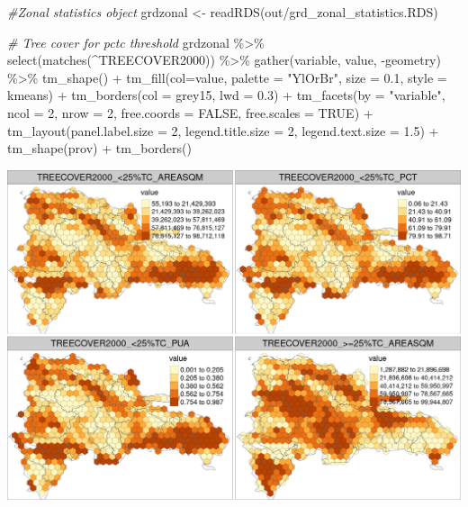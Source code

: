 \documentclass[10pt,landscape,a3paper]{article}
\newenvironment{Shaded}{\begin{snugshade}}{\end{snugshade}}
\newcommand{\AttributeTok}[1]{\textcolor[rgb]{0.77,0.63,0.00}{#1}}
\newcommand{\CommentTok}[1]{\textcolor[rgb]{0.56,0.35,0.01}{\textit{#1}}}
\newcommand{\ConstantTok}[1]{\textcolor[rgb]{0.00,0.00,0.00}{#1}}
\newcommand{\DecValTok}[1]{\textcolor[rgb]{0.00,0.00,0.81}{#1}}
\newcommand{\FloatTok}[1]{\textcolor[rgb]{0.00,0.00,0.81}{#1}}
\newcommand{\FunctionTok}[1]{\textcolor[rgb]{0.00,0.00,0.00}{#1}}
\newcommand{\NormalTok}[1]{#1}
\newcommand{\OtherTok}[1]{\textcolor[rgb]{0.56,0.35,0.01}{#1}}
\newcommand{\SpecialCharTok}[1]{\textcolor[rgb]{0.00,0.00,0.00}{#1}}
\newcommand{\StringTok}[1]{\textcolor[rgb]{0.31,0.60,0.02}{#1}}
\begin{document}
\begin{Shaded}
\begin{Highlighting}[]
\CommentTok{\#Zonal statistics object}
\NormalTok{grdzonal }\OtherTok{\textless{}{-}} \FunctionTok{readRDS}\NormalTok{(}\StringTok{\textquotesingle{}out/grd\_zonal\_statistics.RDS\textquotesingle{}}\NormalTok{)}

\CommentTok{\# Tree cover for pctc threshold}
\NormalTok{grdzonal }\SpecialCharTok{\%\textgreater{}\%} \FunctionTok{select}\NormalTok{(}\FunctionTok{matches}\NormalTok{(}\StringTok{\textquotesingle{}\^{}TREECOVER2000\textquotesingle{}}\NormalTok{)) }\SpecialCharTok{\%\textgreater{}\%}
  \FunctionTok{gather}\NormalTok{(variable, value, }\SpecialCharTok{{-}}\NormalTok{geometry) }\SpecialCharTok{\%\textgreater{}\%}
  \FunctionTok{tm\_shape}\NormalTok{() }\SpecialCharTok{+}
  \FunctionTok{tm\_fill}\NormalTok{(}\AttributeTok{col=}\StringTok{\textquotesingle{}value\textquotesingle{}}\NormalTok{, }\AttributeTok{palette =} \StringTok{"YlOrBr"}\NormalTok{, }\AttributeTok{size =} \FloatTok{0.1}\NormalTok{, }\AttributeTok{style =} \StringTok{\textquotesingle{}kmeans\textquotesingle{}}\NormalTok{) }\SpecialCharTok{+}
  \FunctionTok{tm\_borders}\NormalTok{(}\AttributeTok{col =} \StringTok{\textquotesingle{}grey15\textquotesingle{}}\NormalTok{, }\AttributeTok{lwd =} \FloatTok{0.3}\NormalTok{) }\SpecialCharTok{+}
  \FunctionTok{tm\_facets}\NormalTok{(}\AttributeTok{by =} \StringTok{"variable"}\NormalTok{, }\AttributeTok{ncol =} \DecValTok{2}\NormalTok{, }\AttributeTok{nrow =} \DecValTok{2}\NormalTok{, }\AttributeTok{free.coords =} \ConstantTok{FALSE}\NormalTok{, }\AttributeTok{free.scales =} \ConstantTok{TRUE}\NormalTok{) }\SpecialCharTok{+}
  \FunctionTok{tm\_layout}\NormalTok{(}\AttributeTok{panel.label.size =} \DecValTok{2}\NormalTok{, }\AttributeTok{legend.title.size =} \DecValTok{2}\NormalTok{, }\AttributeTok{legend.text.size =} \FloatTok{1.5}\NormalTok{) }\SpecialCharTok{+}
  \FunctionTok{tm\_shape}\NormalTok{(prov) }\SpecialCharTok{+} \FunctionTok{tm\_borders}\NormalTok{()}
\end{Highlighting}
\end{Shaded}

\begin{center}\includegraphics{img/zonal-long-term-grid-1} \end{center}
\end{document}

